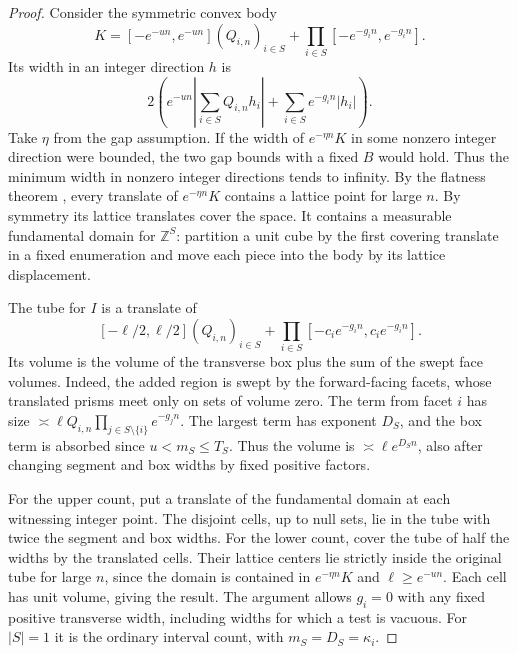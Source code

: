 \documentclass[11pt,a4paper,reqno]{amsart}
\theoremstyle{definition}
\theoremstyle{remark}
\numberwithin{equation}{section}
\begin{document}
\begin{proof}
Consider the symmetric convex body
\[
 K=[-e^{-un},e^{-un}](Q_{i,n})_{i\in S}
       +\prod_{i\in S}[-e^{-g_i n},e^{-g_i n}].
\]
Its width in an integer direction \(h\) is
\[
  2\left(e^{-un}\left|\sum_{i\in S}Q_{i,n}h_i\right|
                   +\sum_{i\in S}e^{-g_i n}|h_i|\right).
\]
Take \(\eta\) from the gap assumption. If the width of \(e^{-\eta n}K\) in some nonzero integer direction were bounded, the two gap bounds with a fixed \(B\) would hold. Thus the minimum width in nonzero integer directions tends to infinity. By the flatness theorem \cite{KL}, every translate of \(e^{-\eta n}K\) contains a lattice point for large \(n\). By symmetry its lattice translates cover the space. It contains a measurable fundamental domain for \(\mathbb Z^S\): partition a unit cube by the first covering translate in a fixed enumeration and move each piece into the body by its lattice displacement.

The tube for \(I\) is a translate of
\[
    [-\ell/2,\ell/2](Q_{i,n})_{i\in S}
        +\prod_{i\in S}[-c_i e^{-g_i n},c_i e^{-g_i n}].
\]
Its volume is the volume of the transverse box plus the sum of the swept face volumes. Indeed, the added region is swept by the forward-facing facets, whose translated prisms meet only on sets of volume zero. The term from facet \(i\) has size \(\asymp \ell Q_{i,n}\prod_{j\in S\setminus\{i\}}e^{-g_j n}\). The largest term has exponent \(D_S\), and the box term is absorbed since \(u<m_S\le T_S\). Thus the volume is \(\asymp \ell e^{D_S n}\), also after changing segment and box widths by fixed positive factors.

For the upper count, put a translate of the fundamental domain at each witnessing integer point. The disjoint cells, up to null sets, lie in the tube with twice the segment and box widths. For the lower count, cover the tube of half the widths by the translated cells. Their lattice centers lie strictly inside the original tube for large \(n\), since the domain is contained in \(e^{-\eta n}K\) and \(\ell\ge e^{-un}\). Each cell has unit volume, giving the result. The argument allows \(g_i=0\) with any fixed positive transverse width, including widths for which a test is vacuous. For \(|S|=1\) it is the ordinary interval count, with \(m_S=D_S=\kappa_i\).


\end{proof}
\end{document}
